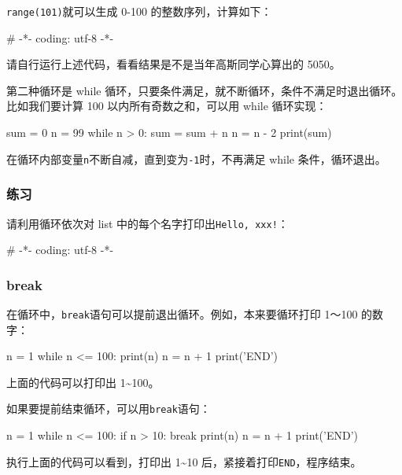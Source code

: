 \texttt{range(101)}就可以生成 0-100 的整数序列，计算如下：

\begin{pythoncode}
# -*- coding: utf-8 -*-
\end{pythoncode}

请自行运行上述代码，看看结果是不是当年高斯同学心算出的 5050。

第二种循环是 while
循环，只要条件满足，就不断循环，条件不满足时退出循环。比如我们要计算 100
以内所有奇数之和，可以用 while 循环实现：

\begin{pythoncode}
sum = 0
n = 99
while n > 0:
    sum = sum + n
    n = n - 2
print(sum)
\end{pythoncode}

在循环内部变量\texttt{n}不断自减，直到变为\texttt{-1}时，不再满足 while
条件，循环退出。

\hypertarget{ux7ec3ux4e60}{%
\subsubsection{练习}\label{ux7ec3ux4e60}}

请利用循环依次对 list 中的每个名字打印出\texttt{Hello,\ xxx!}：

\begin{pythoncode}
# -*- coding: utf-8 -*-
\end{pythoncode}

\hypertarget{break}{%
\subsubsection{break}\label{break}}

在循环中，\texttt{break}语句可以提前退出循环。例如，本来要循环打印
1～100 的数字：

\begin{pythoncode}
n = 1
while n <= 100:
    print(n)
    n = n + 1
print('END')
\end{pythoncode}

上面的代码可以打印出 1\textasciitilde100。

如果要提前结束循环，可以用\texttt{break}语句：

\begin{pythoncode}
n = 1
while n <= 100:
    if n > 10: 
        break 
    print(n)
    n = n + 1
print('END')
\end{pythoncode}

执行上面的代码可以看到，打印出 1\textasciitilde10
后，紧接着打印\texttt{END}，程序结束。

